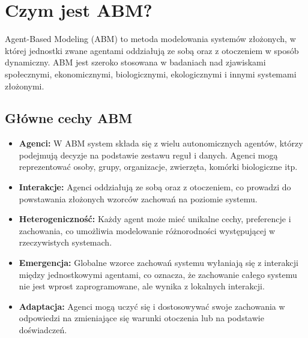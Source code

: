 \section{Czym jest ABM?}
Agent-Based Modeling (ABM) to metoda modelowania systemów złożonych, w której jednostki zwane agentami oddziałują ze sobą oraz z otoczeniem w sposób dynamiczny.
ABM jest szeroko stosowana w badaniach nad zjawiskami społecznymi, ekonomicznymi, biologicznymi, ekologicznymi i innymi systemami złożonymi.

\subsection{Główne cechy ABM}
\begin{itemize}
    \item \textbf{Agenci:} W ABM system składa się z wielu autonomicznych agentów, którzy podejmują decyzje na podstawie zestawu reguł i danych.
          Agenci mogą reprezentować osoby, grupy, organizacje, zwierzęta, komórki biologiczne itp.
    \item \textbf{Interakcje:} Agenci oddziałują ze sobą oraz z otoczeniem, co prowadzi do powstawania złożonych wzorców zachowań na poziomie systemu.
    \item \textbf{Heterogeniczność:} Każdy agent może mieć unikalne cechy, preferencje i zachowania, co umożliwia modelowanie różnorodności występującej w rzeczywistych systemach.
    \item \textbf{Emergencja:} Globalne wzorce zachowań systemu wyłaniają się z interakcji między jednostkowymi agentami, co oznacza, że zachowanie całego systemu nie jest wprost zaprogramowane,
          ale wynika z lokalnych interakcji.
    \item \textbf{Adaptacja:} Agenci mogą uczyć się i dostosowywać swoje zachowania w odpowiedzi na zmieniające się warunki otoczenia lub na podstawie doświadczeń.
\end{itemize}

